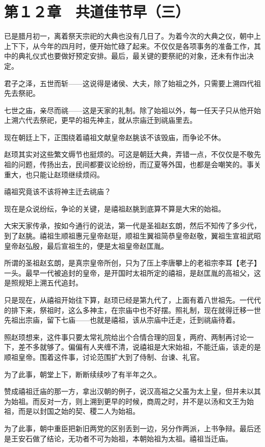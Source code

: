 \section{第１２章　共道佳节早（三）}

已是腊月初一，离着祭天宗祀的大典也没有几日了。为着今次的大典之仪，朝中上上下下，从今年的四月时，便开始忙碌了起来。不仅仅是各项事务的准备工作，其中的典礼仪式也要做好预定安排。最后，最关键的要祭祀的对象，还未有作出决定。

君子之泽，五世而斩——这说得是诸侯、大夫，除了始祖之外，只需要上溯四代祖先去祭祀。

七世之庙，亲尽而祧——这是天家的礼制。除了始祖以外，每一任天子只从他开始上溯六代去祭祀，更早的祖先神主，就从宗庙迁到祧庙里去。

现在朝廷上下，正围绕着禧祖文献皇帝赵朓该不该毁庙，而争论不休。

赵顼其实对这些繁文缛节也挺烦的。可这是朝廷大典，弄错一点，不仅仅是不敬先祖的问题，传扬出去，民间都要议论纷纷，而辽夏等外国，也都是会嘲笑的。事关重大，也只能让赵顼继续烦闷。

禧祖究竟该不该将神主迁去祧庙？

现在是众说纷纭，争论的关键，是禧祖赵朓到底算不算是大宋的始祖。

大宋天家传承，按如今通行的说法，第一代是圣祖赵玄朗，然后不知传了多少代，到了赵朓。禧祖生顺祖惠元皇帝赵珽，顺祖生翼祖简恭皇帝赵敬，翼祖生宣祖武昭皇帝赵弘殷，最后宣祖生的，便是太祖皇帝赵匡胤。

所谓的圣祖赵玄朗，是真宗皇帝所创，只为了压上李唐攀上的老祖宗李耳【老子】一头。最早一代被追封的皇帝，是开国时太祖所定的禧祖，是赵匡胤的高祖父，这是照规矩上溯五代追封。

只是现在，从禧祖开始往下算，赵顼已经是第九代了，上面有着八世祖先。一代代的排下来，祭祖时，这么多神主，在宗庙中也不好摆。照礼制，现在就得迁移一世先祖出宗庙，留下七庙——也就是禧祖，该从宗庙中迁走，迁到祧庙待着。

照赵顼想来，这件事只要太常礼院给出个合情合理的回复，两府、两制再讨论一下，差不多就够了。偏偏有人夹缠不清，说禧祖是大宋始祖，不能迁庙，该走的是顺祖皇帝。围着这件事，讨论范围扩大到了侍制、台谏、礼官。

为了此事，朝堂上下，断断续续吵了有半年之久。

赞成禧祖迁庙的那一方，拿出汉朝的例子，说汉高祖之父虽为太上皇，但并未以其为始祖。而反对一方，则上溯到更早的时候，商周之时，并不是以汤和文王为始祖，而是以封国之始的契、稷二人为始祖。

为了此事，朝中重臣把新旧两党的区别丢到一边，另分作两派，上书争辩。最后还是王安石做了结论，无功者不可为始祖，本朝始祖为太祖。禧祖当迁庙。

